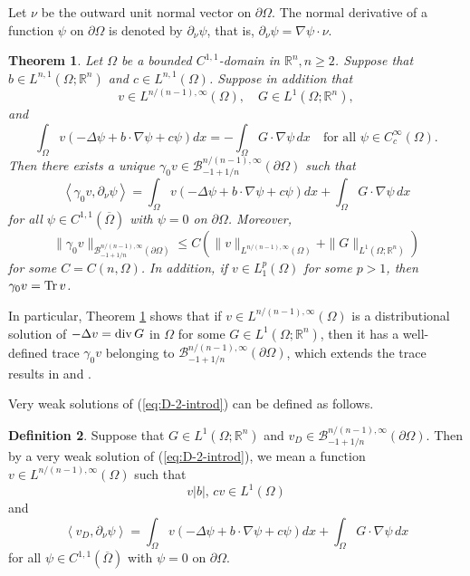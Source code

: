 \documentclass[reqno,centertags,11pt]{amsart}
\newtheorem{thm}{Theorem}
\theoremstyle{definition}
\newtheorem{dfn}[thm]{Definition}
\numberwithin{thm}{section}
\numberwithin{equation}{section}
\newcommand{\R}{{\mathbb{R}}}
\begin{document}
Let $\nu$ be  the outward unit normal vector on $\partial\Omega$. The normal derivative of a function $\psi$ on $\partial\Omega$ is  denoted by $ \partial_\nu \psi$, that is,  $\partial_\nu \psi =\nabla \psi \cdot \nu $.




\begin{thm}\label{trace results-VWS} Let  $\Omega$ be a  bounded $C^{1,1}$-domain in $\R^n , n \ge 2$.  Suppose that $b \in L^{n,1}(\Omega ; \R^n )$ and    $ c \in L^{n,1}(\Omega )$.   Suppose in addition  that
\[
  v \in L^{n/(n-1),\infty}(\Omega ), \quad  G \in L^1 (\Omega ; \R^n ),
\]
and
\[
\int_\Omega v \left(- \Delta \psi  + b \cdot \nabla \psi +c\psi \right)  dx = - \int_\Omega G \cdot \nabla \psi \, d x \quad\mbox{for all}\,\, \psi \in C_c^\infty (\Omega ).
\]
Then there exists a unique  $\gamma_0 v \in \mathcal{B}_{-1+1/n}^{n/(n-1),\infty}(\partial\Omega )$ such that
\begin{equation}\label{Green identity}
\left\langle \gamma_0 v ,  \partial_\nu \psi   \right\rangle =\int_\Omega v \left(- \Delta \psi  + b \cdot \nabla \psi +c\psi \right)  dx + \int_\Omega G \cdot \nabla \psi \, d x
\end{equation}
for all $\psi \in C^{1,1}(\overline{\Omega})$ with $\psi =0$ on $\partial\Omega$. Moreover,
\[
\|\gamma_0 v \|_{\mathcal{B}_{-1+1/n}^{n/(n-1),\infty}(\partial\Omega )} \le C \left( \|v\|_{L^{n/(n-1),\infty}(\Omega )}+ \|G\|_{ L^1 (\Omega ; \R^n )} \right)
\]
for some $C=C(n,\Omega )$. In addition, if $v \in L_1^{p}(\Omega )$ for some $p>1$, then  $\gamma_0 v = {\rm Tr\, }v$.
\end{thm}


In particular, Theorem \ref{trace results-VWS} shows that if $v \in L^{n/(n-1),\infty}(\Omega )$ is a distributional solution of $-\Delta v ={\rm div}\, G$ in $\Omega$ for some $G\in L^1 (\Omega ; \R^n )$, then it has a well-defined trace $\gamma_0 v$ belonging to  $\mathcal{B}_{-1+1/n}^{n/(n-1),\infty}(\partial\Omega )$, which extends the trace results in \cite[Theorem 8]{Kim09} and \cite[Lemma 2]{AR11}.


Very weak solutions of (\ref{eq:D-2-introd}) can be defined as follows.

\begin{dfn}\label{def-solutions}  Suppose that $ G \in L^1  (\Omega ;\R^n )$ and $v_D \in \mathcal{B}_{-1+1/n}^{n/(n-1),\infty}(\partial\Omega )$.
Then by a very weak solution of (\ref{eq:D-2-introd}), we mean a function $v \in L^{n/(n-1) ,\infty}(\Omega )$ such that
\[
v|b|,\, cv \in L^1 (\Omega )
\]
and
\[
\left\langle  v_D ,  \partial_\nu \psi   \right\rangle =\int_\Omega v \left(- \Delta \psi  + b \cdot \nabla \psi +c\psi \right)  dx + \int_\Omega G \cdot \nabla \psi \, d x
\]
for all $\psi \in C^{1,1} (\overline{\Omega} )$ with $\psi =0$ on $\partial\Omega$.
\end{dfn}
\end{document}
